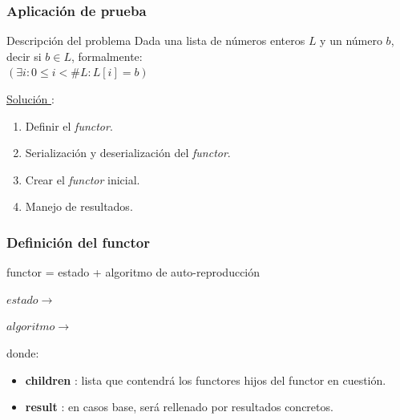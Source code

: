\begin{frame}\frametitle{Aplicación de prueba}
    \begin{block}{Descripción del problema}
        Dada una lista de números enteros $L$ y un número $b$, decir si $b \in L$, formalmente:\\
        \centering$(\exists i: 0 \leq i < \#L : L[i] = b)$
    \end{block}
    \pause
    \vspace{0.3cm}
    \underline{Solución \rc}:\\
    \begin{enumerate}
        \item   Definir el \textit{functor}.
        \item   Serialización y deserialización del \textit{functor}.
        \item   Crear el \textit{functor} inicial.
        \item   Manejo de resultados.
    \end{enumerate}
\end{frame}

\begin{frame}\frametitle{Definición del functor}
    \begin{block}{}\centering functor = estado + algoritmo de auto-reproducción\end{block}
    \vspace{0.3cm}
    \pause
    $estado \rightarrow$ 
    \vspace{0.3cm}
    \pause
    \pause

    $algoritmo \rightarrow$ 
    \pause
    \vspace{0.2cm}
    \begin{block}{}%
        donde:\\
        \begin{itemize}
            \item \textbf{children} : lista que contendrá los functores hijos del functor en cuestión.
            \item \textbf{result} : en casos base, será rellenado por resultados concretos.
        \end{itemize}
    \end{block}
\end{frame}

